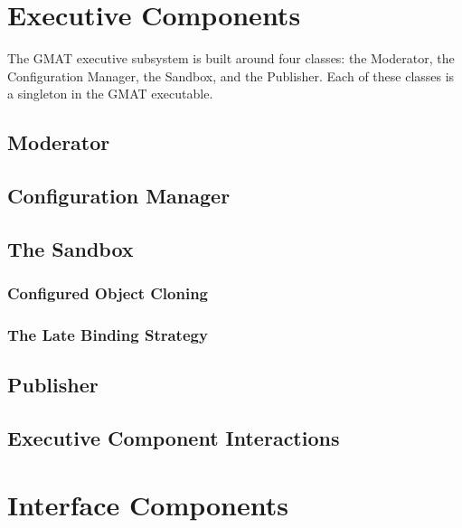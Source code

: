 \section{\label{section:ExecutiveComponents}Executive Components}

The GMAT executive subsystem is built around four classes: the Moderator, the Configuration
Manager, the Sandbox, and the Publisher.  Each of these classes is a singleton in the GMAT
executable.

\subsection{Moderator}



\subsection{Configuration Manager}



\subsection{\label{section:Sandbox}The Sandbox}


\subsubsection{\label{section:SandboxCloning}Configured Object Cloning}


\subsubsection{\label{section:SandboxLateBinding}The Late Binding Strategy}


\subsection{Publisher}



\subsection{Executive Component Interactions}



\section{\label{section:InterfaceOverview}Interface Components}


